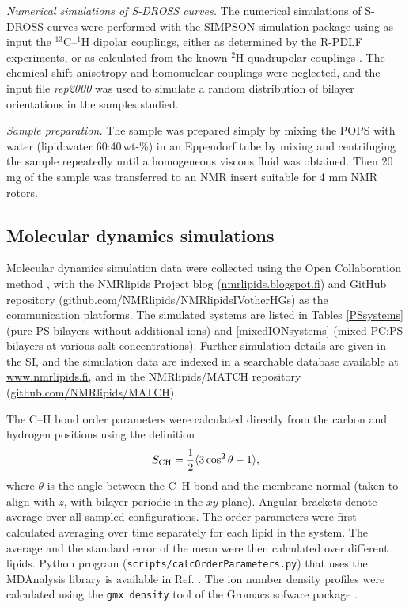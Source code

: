 \documentclass[aps,prl,superscriptaddress,twocolumn]{revtex4}
\begin{document}
\emph{Numerical simulations of S-DROSS curves.}
The numerical simulations of S-DROSS curves were performed with the SIMPSON simulation package \cite{bak00}
using as input the $^{13}$C--$^1$H
dipolar couplings, either as determined by the R-PDLF experiments, or as calculated from the known $^2$H quadrupolar couplings \cite{browning80}.
The chemical shift anisotropy and homonuclear couplings were neglected, and the input file {\it{rep2000}} was used to simulate a random
distribution of bilayer orientations in the samples studied.

\emph{Sample preparation.}
The sample was prepared simply by mixing the POPS  with water (lipid:water 60:40\,wt-\%) in an Eppendorf
tube by mixing and centrifuging the sample repeatedly until a  homogeneous viscous fluid was obtained.
Then 20 mg of the sample was  transferred to an NMR insert suitable for 4 mm NMR rotors.  

\subsection{Molecular dynamics simulations}
Molecular dynamics simulation data were collected using
the Open Collaboration method \cite{botan15}, with
the NMR\-lipids Project blog (\url{nmrlipids.blogspot.fi}) and
GitHub repository (\url{github.com/NMRlipids/NMRlipidsIVotherHGs})
as the communication platforms.
The simulated systems are listed in 
Tables \ref{PSsystems} (pure PS bilayers without additional ions) 
and \ref{mixedIONsystems} (mixed PC:PS bilayers at various salt concentrations).
Further simulation details are given in the SI, and
the simulation data are indexed in a
searchable database available at \url{www.nmrlipids.fi},
and in the NMRlipids/MATCH repository (\url{github.com/NMRlipids/MATCH}).

The C--H bond order parameters were calculated directly
from the carbon and hydrogen positions using the definition
\begin{equation}
S_{\rm CH}=\frac{1}{2}\langle 3\cos^2\theta -1 \rangle,
\end{equation}
where $\theta$ is the angle between the C--H bond and the membrane normal
(taken to align with $z$, with bilayer periodic in the $xy$-plane).
Angular brackets denote average over all sampled configurations.
The order parameters were first calculated averaging over time separately
for each lipid in the system. The average and
the standard error of the mean were then calculated over different lipids.
Python program ({\tt scripts/calcOrderParameters.py}) that uses the
MDAnalysis library \cite{agrawal11,gowers16} is available in Ref. . 
The ion  number density profiles were calculated using the {\tt gmx density} tool
of the Gromacs sofware package \cite{gromacsMANUAL}.
\end{document}
